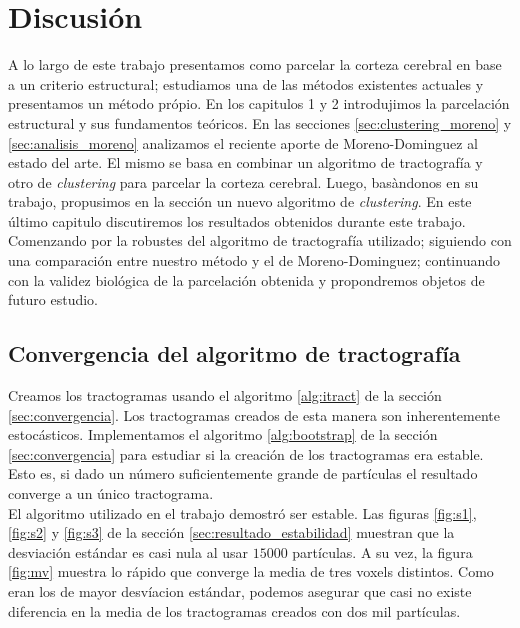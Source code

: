 \chapter{Discusi\'on} 

A lo largo de este trabajo presentamos como parcelar la corteza cerebral
en base a un criterio estructural; estudiamos una de las m\'etodos
existentes actuales y presentamos un m\'etodo pr\'opio. En los capitulos
1 y 2 introdujimos la parcelaci\'on estructural y sus fundamentos 
te\'oricos. En las secciones \ref{sec:clustering_moreno} y 
\ref{sec:analisis_moreno} analizamos el reciente aporte de 
Moreno-Dominguez \cite{Moreno-Dominguez2014} al estado del arte. El mismo
se basa en combinar un algoritmo de tractograf\'ia y otro de 
\textit{clustering} para parcelar la corteza cerebral. Luego, bas\`andonos
en su trabajo, propusimos en la secci\'on \label{ch:nuestro} un nuevo
algoritmo de \textit{clustering}. En este \'ultimo capitulo discutiremos
los resultados obtenidos durante este trabajo. Comenzando por la robustes
del algoritmo de tractograf\'ia utilizado; siguiendo con una comparaci\'on
entre nuestro m\'etodo y el de Moreno-Dominguez; continuando con la 
validez biol\'ogica de la parcelaci\'on obtenida y propondremos objetos de
futuro estudio. \\

\section{Convergencia del algoritmo de tractograf\'ia}

Creamos los tractogramas usando el algoritmo \ref{alg:itract} de la 
secci\'on \ref{sec:convergencia}. Los tractogramas creados de esta manera
son inherentemente estoc\'asticos. Implementamos el algoritmo 
\ref{alg:bootstrap} de la secci\'on \ref{sec:convergencia} para estudiar
si la creaci\'on de los tractogramas era estable. Esto es, si dado un 
n\'umero suficientemente grande de part\'iculas el resultado converge
a un \'unico tractograma. \\

El algoritmo utilizado en el trabajo demostr\'o ser estable. Las figuras 
\ref{fig:s1}, \ref{fig:s2} y \ref{fig:s3} de la secci\'on 
\ref{sec:resultado_estabilidad} muestran que la desviaci\'on est\'andar es
casi nula al usar $15000$ part\'iculas. A su vez, la figura \ref{fig:mv}
muestra lo r\'apido que converge la media de tres voxels distintos. 
Como eran los de mayor desv\'iacion est\'andar, podemos asegurar que casi
no existe diferencia en la media de los tractogramas creados con dos mil
part\'iculas. \\

